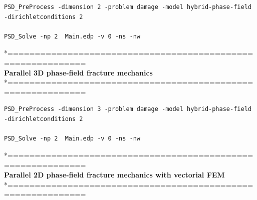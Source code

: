 \begin{lstlisting}[style=BashInputStyle]
PSD_PreProcess -dimension 2 -problem damage -model hybrid-phase-field -dirichletconditions 2   

PSD_Solve -np 2  Main.edp -v 0 -ns -nw   
\end{lstlisting}
*============================================================\\
\textbf{ Parallel 3D phase-field fracture mechanics} \\
*============================================================\\
\begin{lstlisting}[style=BashInputStyle]
PSD_PreProcess -dimension 3 -problem damage -model hybrid-phase-field -dirichletconditions 2   

PSD_Solve -np 2  Main.edp -v 0 -ns -nw   
\end{lstlisting}
*============================================================\\
\textbf{ Parallel 2D phase-field fracture mechanics with vectorial FEM } \\
*============================================================\\

